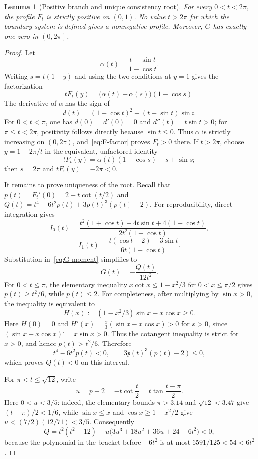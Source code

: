 \documentclass[11pt]{amsart}
\newtheorem{lemma}[theorem]{Lemma}
\theoremstyle{definition}
\theoremstyle{remark}
\begin{document}
\begin{lemma}[Positive branch and unique consistency root]\label{lem:branch}
For every $0<t<2\pi$, the profile $F_t$ is strictly positive on $(0,1)$. No value $t>2\pi$ for which the boundary system is defined gives a nonnegative profile. Moreover, $G$ has exactly one zero in $(0,2\pi)$.
\end{lemma}
\begin{proof}
Let
\[
 \alpha(t)=\frac{t-\sin t}{1-\cos t}.
\]
Writing $s=t(1-y)$ and using the two conditions at $y=1$ gives the factorization
\begin{equation}\label{eq:F-factor}
 tF_t(y)=\bigl(\alpha(t)-\alpha(s)\bigr)(1-\cos s).
\end{equation}
The derivative of $\alpha$ has the sign of
\[
 d(t)=(1-\cos t)^2-(t-\sin t)\sin t.
\]
For $0<t<\pi$, one has $d(0)=d'(0)=0$ and $d''(t)=t\sin t>0$; for $\pi\leq t<2\pi$, positivity follows directly because $\sin t\leq0$. Thus $\alpha$ is strictly increasing on $(0,2\pi)$, and~\eqref{eq:F-factor} proves $F_t>0$ there. If $t>2\pi$, choose $y=1-2\pi/t$ in the equivalent, unfactored identity
\[
 tF_t(y)=\alpha(t)(1-\cos s)-s+\sin s;
\]
then $s=2\pi$ and $tF_t(y)=-2\pi<0$.

It remains to prove uniqueness of the root. Recall that
$p(t)=F_t'(0)=2-t\cot(t/2)$ and
$Q(t)=t^4-6t^2p(t)+3p(t)^3(p(t)-2)$.
For reproducibility, direct integration gives
\[
 I_0(t)=
 \frac{t^2(1+\cos t)-4t\sin t+4(1-\cos t)}
      {2t^2(1-\cos t)},
\]
\[
 I_1(t)=
 \frac{t(\cos t+2)-3\sin t}{6t(1-\cos t)}.
\]
Substitution in~\eqref{eq:G-moment} simplifies to
\begin{equation}\label{eq:G-Q}
 G(t)=-\frac{Q(t)}{12t^2}.
\end{equation}
For $0<t\leq\pi$, the elementary inequality
$x\cot x\leq1-x^2/3$ for $0<x\leq\pi/2$ gives
$p(t)\geq t^2/6$, while $p(t)\leq2$. For completeness, after multiplying by
$\sin x>0$, the inequality is equivalent to
\[
 H(x):=(1-x^2/3)\sin x-x\cos x\geq0.
\]
Here $H(0)=0$ and
$H'(x)=\frac{x}{3}(\sin x-x\cos x)>0$ for $x>0$, since
$(\sin x-x\cos x)'=x\sin x>0$. Thus the cotangent inequality is strict
for $x>0$, and hence $p(t)>t^2/6$. Therefore
\[
 t^4-6t^2p(t)<0,
 \qquad
 3p(t)^3(p(t)-2)\leq0,
\]
which proves $Q(t)<0$ on this interval.

For $\pi<t\leq\sqrt{12}$, write
\[
 u=p-2=-t\cot\frac t2=t\tan\frac{t-\pi}{2}.
\]
Here $0<u<3/5$: indeed, the elementary bounds $\pi>3.14$ and
$\sqrt{12}<3.47$ give $(t-\pi)/2<1/6$, while
$\sin x\leq x$ and $\cos x\geq1-x^2/2$ give
$u<(7/2)(12/71)<3/5$. Consequently
\[
 Q=t^2(t^2-12)
 +u\bigl(3u^3+18u^2+36u+24-6t^2\bigr)<0,
\]
because the polynomial in the bracket before $-6t^2$ is at most
$6591/125<54<6t^2$.


\end{proof}
\end{document}
